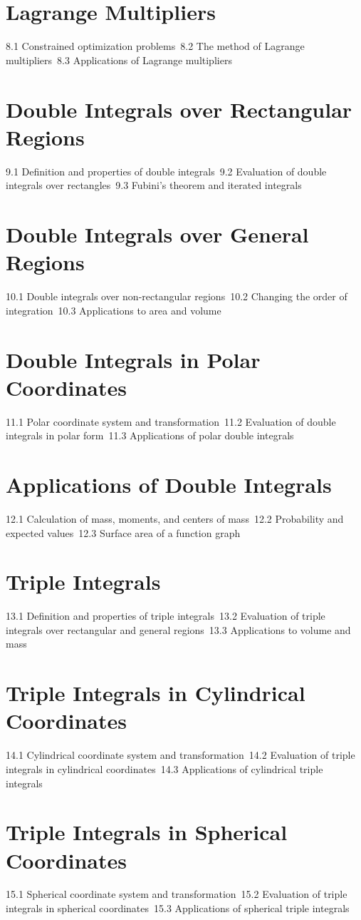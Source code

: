 \section{Lagrange Multipliers}
8.1 Constrained optimization problems\
8.2 The method of Lagrange multipliers\
8.3 Applications of Lagrange multipliers\
\section{Double Integrals over Rectangular Regions}
9.1 Definition and properties of double integrals\
9.2 Evaluation of double integrals over rectangles\
9.3 Fubini's theorem and iterated integrals\
\section{Double Integrals over General Regions}
10.1 Double integrals over non-rectangular regions\
10.2 Changing the order of integration\
10.3 Applications to area and volume\
\section{Double Integrals in Polar Coordinates}
11.1 Polar coordinate system and transformation\
11.2 Evaluation of double integrals in polar form\
11.3 Applications of polar double integrals\
\section{Applications of Double Integrals}
12.1 Calculation of mass, moments, and centers of mass\
12.2 Probability and expected values\
12.3 Surface area of a function graph\
\section{Triple Integrals}
13.1 Definition and properties of triple integrals\
13.2 Evaluation of triple integrals over rectangular and general regions\
13.3 Applications to volume and mass\
\section{Triple Integrals in Cylindrical Coordinates}
14.1 Cylindrical coordinate system and transformation\
14.2 Evaluation of triple integrals in cylindrical coordinates\
14.3 Applications of cylindrical triple integrals\
\section{Triple Integrals in Spherical Coordinates}
15.1 Spherical coordinate system and transformation\
15.2 Evaluation of triple integrals in spherical coordinates\
15.3 Applications of spherical triple integrals\
